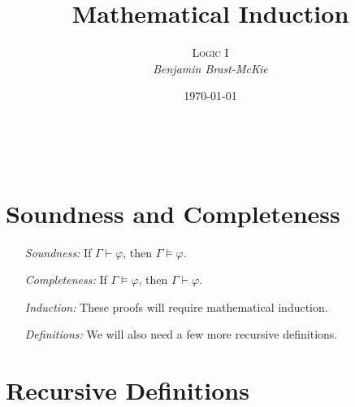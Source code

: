 \documentclass[a4paper, 11pt]{article} %
\title{\textbf{Mathematical Induction}} %
\author{\textsc{Logic I}\\ \em Benjamin Brast-McKie} %
\date{\today} %
\makeatletter
\renewcommand{\maketitle}{
\begin{flushright}
{\LARGE\@title}

\vspace{10pt}

{\@author}
\\ \@date
\end{flushright}

\vspace{-20pt}

}
\makeatother
\begin{document}
\maketitle %

\thispagestyle{empty}




\section*{Soundness and Completeness}

\begin{enumerate}
  \item[\it Soundness:] If $\Gamma \vdash \varphi$, then $\Gamma \vDash \varphi$.
  \item[\it Completeness:] If $\Gamma \vDash \varphi$, then $\Gamma \vdash \varphi$.
  \item[\it Induction:] These proofs will require mathematical induction. 
  \item[\it Definitions:] We will also need a few more recursive definitions.
\end{enumerate}



\section*{Recursive Definitions}
\end{document}
